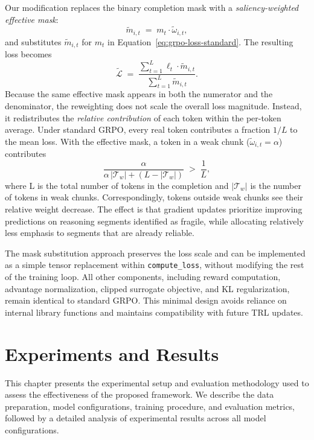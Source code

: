 \documentclass[12pt]{report}
\begin{document}
Our modification replaces the binary completion mask with a
\emph{saliency-weighted effective mask}:
\begin{equation}
  \tilde{m}_{i,t}
  \;=\;
  m_t \cdot \tilde{\omega}_{i,t},
  \label{eq:effective-mask}
\end{equation}
and substitutes $\tilde{m}_{i,t}$ for $m_t$ in
Equation~\eqref{eq:grpo-loss-standard}.  The resulting loss becomes
\begin{equation}
  \tilde{\mathcal{L}}
  \;=\;
  \frac{\sum_{t=1}^{L} \ell_t \cdot \tilde{m}_{i,t}}
       {\sum_{t=1}^{L} \tilde{m}_{i,t}}.
  \label{eq:grpo-loss-reweighted}
\end{equation}
Because the same effective mask appears in both the numerator and the
denominator, the reweighting does not scale the overall loss magnitude.
Instead, it redistributes the \emph{relative contribution} of each token
within the per-token average.  Under standard GRPO, every real token
contributes a fraction $1/L$ to the mean loss.  With the effective mask, a
token in a weak chunk ($\tilde{\omega}_{i,t} = \alpha$) contributes
\begin{equation}
  \frac{\alpha}
       {\alpha\,|\mathcal{T}_w| + (L - |\mathcal{T}_w|)}
  \;>\;
  \frac{1}{L},
  \label{eq:reweighted-fraction}
\end{equation}
where L is the total number of tokens in the completion and ${|\mathcal{T}_w|}$ is the number of tokens in weak chunks.
Correspondingly, tokens outside weak chunks see their relative weight
decrease. The effect is that gradient updates prioritize improving predictions on reasoning segments identified as fragile, while allocating relatively less emphasis to segments that are already reliable.


The mask substitution approach preserves the loss scale and can be
implemented as a simple tensor replacement within
\texttt{compute\_\allowbreak loss}, without modifying the rest of the training loop.
All other components, including reward computation, advantage normalization, clipped surrogate objective, and KL regularization, remain identical to
standard GRPO. This minimal design avoids reliance on internal library functions
and maintains compatibility with future TRL updates.

\chapter{Experiments and Results}

This chapter presents the experimental setup and evaluation methodology used to assess the effectiveness of the proposed framework. 
We describe the data preparation, model configurations, training procedure, and evaluation metrics, followed by a detailed analysis of experimental results across all model configurations.
\end{document}
